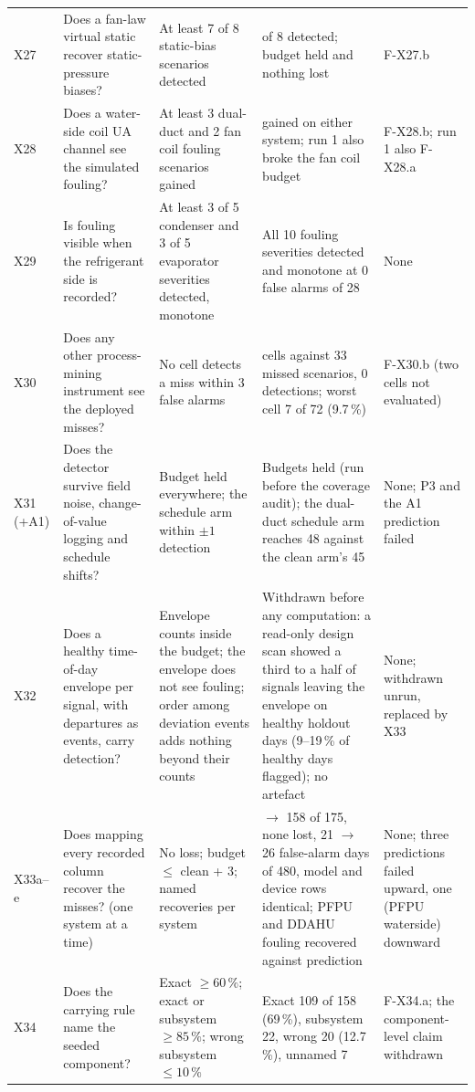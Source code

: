 \documentclass[11pt,letterpaper]{article}
\begin{document}
{\begin{longtable}{@{}>{\raggedright\arraybackslash}p{0.9cm}>{\raggedright\arraybackslash}p{4.3cm}>{\raggedright\arraybackslash}p{3.2cm}>{\raggedright\arraybackslash}p{4.2cm}>{\raggedright\arraybackslash}p{2.4cm}@{}}
X27 & Does a fan-law virtual static recover static-pressure biases? & At least 7 of 8 static-bias scenarios detected & 6 of 8 detected; budget held and nothing lost & F-X27.b \\
X28 & Does a water-side coil UA channel see the simulated fouling? & At least 3 dual-duct and 2 fan coil fouling scenarios gained & 0 gained on either system; run 1 also broke the fan coil budget & F-X28.b; run 1 also F-X28.a \\
X29 & Is fouling visible when the refrigerant side is recorded? & At least 3 of 5 condenser and 3 of 5 evaporator severities detected, monotone & All 10 fouling severities detected and monotone at 0 false alarms of 28 & None \\
X30 & Does any other process-mining instrument see the deployed misses? & No cell detects a miss within 3 false alarms & 33 cells against 33 missed scenarios, 0 detections; worst cell 7 of 72 (9.7\,\%) & F-X30.b (two cells not evaluated) \\
X31 (+A1) & Does the detector survive field noise, change-of-value logging and schedule shifts? & Budget held everywhere; the schedule arm within $\pm 1$ detection & Budgets held (run before the coverage audit); the dual-duct schedule arm reaches 48 against the clean arm's 45 & None; P3 and the A1 prediction failed \\
X32 & Does a healthy time-of-day envelope per signal, with departures as events, carry detection? & Envelope counts inside the budget; the envelope does not see fouling; order among deviation events adds nothing beyond their counts & Withdrawn before any computation: a read-only design scan showed a third to a half of signals leaving the envelope on healthy holdout days (9--19\,\% of healthy days flagged); no artefact & None; withdrawn unrun, replaced by X33 \\
X33a--e & Does mapping every recorded column recover the misses? (one system at a time) & No loss; budget $\le$ clean + 3; named recoveries per system & 142 $\to$ 158 of 175, none lost, 21 $\to$ 26 false-alarm days of 480, model and device rows identical; PFPU and DDAHU fouling recovered against prediction & None; three predictions failed upward, one (PFPU waterside) downward \\
X34 & Does the carrying rule name the seeded component? & Exact $\ge 60\,\%$; exact or subsystem $\ge 85\,\%$; wrong subsystem $\le 10\,\%$ & Exact 109 of 158 (69\,\%), subsystem 22, wrong 20 (12.7\,\%), unnamed 7 & F-X34.a; the component-level claim withdrawn \\

\end{longtable}}
\end{document}
